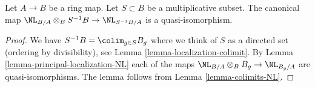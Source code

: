 \begin{lemma}
\label{lemma-localize-NL}
Let $A \to B$ be a ring map. Let $S \subset B$ be a multiplicative subset.
The canonical map $\NL_{B/A} \otimes_B S^{-1}B \to \NL_{S^{-1}B/A}$
is a quasi-isomorphism.
\end{lemma}

\begin{proof}
We have $S^{-1}B = \colim_{g \in S} B_g$ where we think of $S$
as a directed set (ordering by divisibility), see
Lemma \ref{lemma-localization-colimit}.
By Lemma \ref{lemma-principal-localization-NL} each of the maps
$\NL_{B/A} \otimes_B B_g \to \NL_{B_g/A}$
are quasi-isomorphisms.
The lemma follows from Lemma \ref{lemma-colimits-NL}.
\end{proof}
